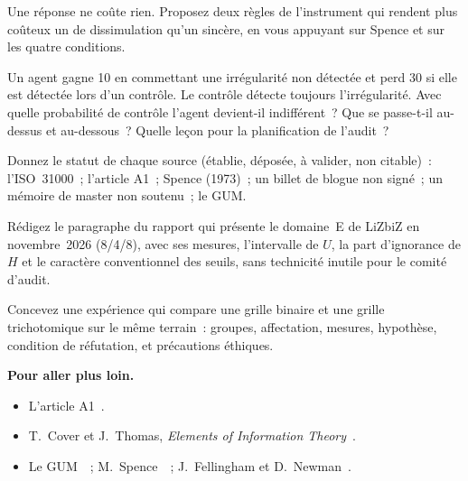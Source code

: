\begin{boxexo}[title={\ding{45}\quad Exercice~31.6. Rendre le signal coûteux \niveaumoyen}]
Une réponse \NEK{} ne coûte rien. Proposez deux règles de l'instrument qui
rendent plus coûteux un \NEK{} de dissimulation qu'un \NEK{} sincère, en
vous appuyant sur Spence et sur les quatre conditions.
\end{boxexo}

\begin{boxexo}[title={\ding{45}\quad Exercice~31.7. Un jeu d'inspection \niveaumoyen}]
Un agent gagne 10 en commettant une irrégularité non détectée et perd 30 si
elle est détectée lors d'un contrôle. Le contrôle détecte toujours
l'irrégularité. Avec quelle probabilité de contrôle l'agent devient-il
indifférent~? Que se passe-t-il au-dessus et au-dessous~? Quelle leçon pour
la planification de l'audit~?
\end{boxexo}

\begin{boxexo}[title={\ding{45}\quad Exercice~31.8. Le statut des sources \niveaubase}]
Donnez le statut de chaque source (établie, déposée, à valider, non
citable)~: l'ISO~31000~; l'article A1~; Spence (1973)~; un billet de
blogue non signé~; un mémoire de master non soutenu~; le GUM.
\end{boxexo}

\begin{boxexo}[title={\ding{45}\quad Exercice~31.9. Écrire l'incertitude \niveauexpert}]
Rédigez le paragraphe du rapport qui présente le domaine~E de LiZbiZ en
novembre~2026 (8/4/8), avec ses mesures, l'intervalle de $U$, la part
d'ignorance de $H$ et le caractère conventionnel des seuils, sans
technicité inutile pour le comité d'audit.
\end{boxexo}

\begin{boxexo}[title={\ding{45}\quad Exercice~31.10. Concevoir une expérience \niveauexpert}]
Concevez une expérience qui compare une grille binaire et une grille
trichotomique sur le même terrain~: groupes, affectation, mesures,
hypothèse, condition de réfutation, et précautions éthiques.
\end{boxexo}

\bigskip

\begin{boxinfo}
\textbf{Pour aller plus loin.}
\begin{itemize}
    \item L'article A1~\cite{minka2026nek}.
    \item T.~Cover et J.~Thomas, \emph{Elements of Information
          Theory}~\cite{cover2006elements}.
    \item Le GUM~\cite{jcgm2008gum}~; M.~Spence~\cite{spence1973signaling}~;
          J.~Fellingham et D.~Newman~\cite{fellingham1985strategic}.
\end{itemize}
\end{boxinfo}

